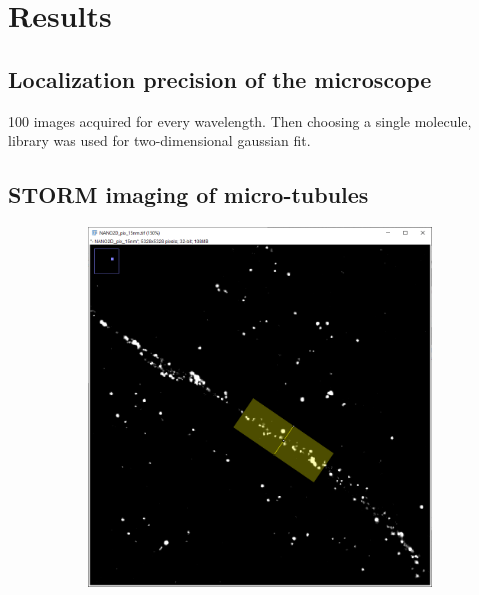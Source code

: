 \section{Results}
\subsection{Localization precision of the microscope}
100 images acquired for every wavelength.
Then choosing a single molecule,  library was used for two-dimensional gaussian fit.

\subsection{STORM imaging of micro-tubules}
\begin{figure}[htbp]
    \begin{subfigure}{0.5\textwidth}
        \includegraphics[width=\textwidth]{figures/microtubules_width_acquisition.PNG}
    \end{subfigure}
    \begin{subfigure}{0.5\textwidth}

\end{subfigure}
\end{figure}
